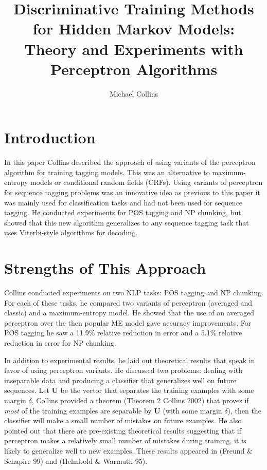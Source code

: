 \documentclass[fleqn,11pt]{wlpeerj} %
\title{Discriminative Training Methods for Hidden Markov Models: Theory and Experiments with Perceptron Algorithms}
\author[]{Michael Collins}
\affil[]{AT\&T Labs-Research Florham Park, New Jersey.}
\begin{document}
\flushbottom
\maketitle
\thispagestyle{empty}

\section*{Introduction}

In this paper Collins described the approach of using variants of the perceptron algorithm for training tagging models. This was an alternative to maximum-entropy models or conditional random fields (CRFs). Using variants of perceptron for sequence tagging problems was an innovative idea as previous to this paper it was mainly used for classification tasks and had not been used for sequence tagging. He conducted experiments for POS tagging and NP chunking, but showed that this new algorithm generalizes to any sequence tagging task that uses Viterbi-style algorithms for decoding. 

\section*{Strengths of This Approach}

Collins conducted experiments on two NLP tasks: POS tagging and NP chunking. For each of these tasks, he compared two variants of perceptron (averaged and classic) and a maximum-entropy model. He showed that the use of an averaged perceptron over the then popular ME model gave accuracy improvements. For POS tagging he saw a 11.9\% relative reduction in error and a 5.1\% relative reduction in error for NP chunking.

In addition to experimental results, he laid out theoretical results that speak in favor of using perceptron variants. He discussed two problems: dealing with inseparable data and producing a classifier that generalizes well on future sequences. Let $\mathbf{U}$ be the vector that separates the training examples with some margin $\delta$, Collins provided a theorem (Theorem 2 Collins 2002) that proves if \textit{most} of the training examples are separable by $\mathbf{U}$ (with some margin $\delta$), then the classifier will make a small number of mistakes on future examples. He also pointed out that  there are pre-existing theoretical results suggesting that if perceptron makes a relatively small number of mistakes during training, it is likely to generalize well to new examples. These results appeared in (Freund \& Schapire 99) and (Helmbold \& Warmuth 95).
\end{document}
